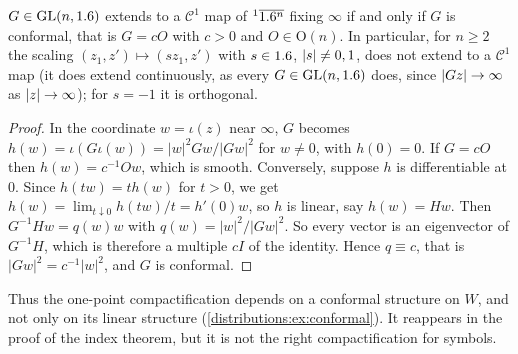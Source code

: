 \begin{proposition}\label{distributions:prop:one-point}
$G\in\operatorname{GL}(n,1.6)$ extends to a $\mathcal{C}^1$ map of ${}^{1}\overline{1.6^n}$ fixing $\infty$ if and
only if $G$ is conformal, that is $G=cO$ with $c>0$ and $O\in\mathrm{O}(n)$. In
particular, for $n\ge2$ the scaling $(z_1,z')\mapsto(sz_1,z')$ with $s\in1.6$,
$\lvert s\rvert\ne0,1$, does not extend to a $\mathcal{C}^1$ map \textup{(}it does extend
continuously, as every $G\in\operatorname{GL}(n,1.6)$ does, since $\lvert Gz\rvert\to\infty$ as
$\lvert z\rvert\to\infty$\textup{)}; for $s=-1$ it is orthogonal.
\end{proposition}
\begin{proof}
In the coordinate $w=\iota(z)$ near $\infty$, $G$ becomes
$h(w)=\iota(G\iota(w))=|w|^2Gw/|Gw|^2$ for $w\neq0$, with $h(0)=0$. If $G=cO$ then
$h(w)=c^{-1}Ow$, which is smooth. Conversely, suppose $h$ is differentiable at $0$.
Since $h(tw)=th(w)$ for $t>0$, we get
$h(w)=\lim_{t\downarrow0}h(tw)/t=h'(0)w$, so $h$ is linear, say $h(w)=Hw$. Then
$G^{-1}Hw=q(w)w$ with $q(w)=|w|^2/|Gw|^2$. So every vector is an eigenvector of
$G^{-1}H$, which is therefore a multiple $cI$ of the identity. Hence $q\equiv c$, that
is $|Gw|^2=c^{-1}|w|^2$, and $G$ is conformal.
\end{proof}

Thus the one-point compactification depends on a conformal structure on $W$, and not
only on its linear structure (\cref{distributions:ex:conformal}). It reappears in the
proof of the index theorem, but it is not the right compactification for symbols.

